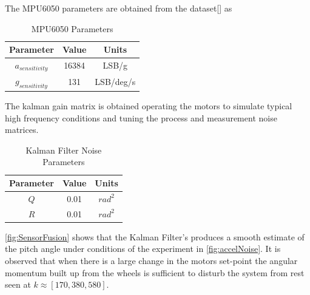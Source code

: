         The MPU6050 parameters are obtained from the dataset[] as 
        \begin{table}[H]
            \centering
            \begin{tabular}{|c|c|c|}
                \hline
                Parameter & Value & Units \\
                \hline
                $a_{sensitivity}$ & 16384 & LSB/g \\
                $g_{sensitivity}$ & 131 & LSB/deg/s \\
                \hline
            \end{tabular}
            \caption{MPU6050 Parameters}
        \end{table}
        The kalman gain matrix is obtained operating the motors to simulate typical high frequency conditions 
        and tuning the process and measurement noise matrices.
        \begin{table}[H]
            \centering
            \begin{tabular}{|c|c|c|}
                \hline
                Parameter & Value & Units \\
                \hline
                $Q$ & 0.01 & $rad^2$ \\
                $R$ & 0.01 & $rad^2$ \\
                \hline
            \end{tabular}
            \caption{Kalman Filter Noise Parameters}
        \end{table}

       
        \ref{fig:SensorFusion} shows that the Kalman Filter's produces a smooth estimate of the pitch angle
        under conditions of the experiment in \ref{fig:accelNoise}. It is observed that when there is a 
        large change in the motors set-point  the angular momentum built up from the wheels is sufficient to 
        disturb the system from rest seen at $k \approx [170, 380, 580]$.
        \pagebreak{}

